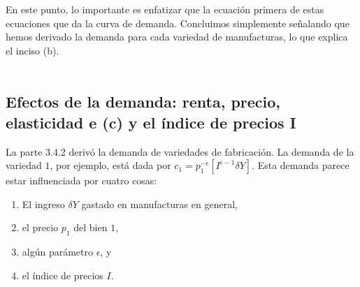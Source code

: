 En este punto, lo importante es enfatizar que la ecuación primera de estas ecuaciones que da la curva de demanda. Concluimos simplemente señalando que hemos derivado la demanda para cada variedad de manufacturas, lo que explica el inciso (b).\\\\

\subsection{Efectos de la demanda: renta, precio, elasticidad e (c) y el índice de precios I}
La parte 3.4.2 derivó la demanda de variedades de fabricación. La demanda de la variedad $1$, por ejemplo, está dada por $c_1 = p_1^{-\epsilon}[I^{\epsilon-1} \delta Y]$. Esta demanda parece estar influenciada por cuatro cosas:

\begin{enumerate}[\bfseries (i)]
    \item  El ingreso $\delta Y$ gastado en manufacturas en general,
    \item  el precio $p_1$ del bien $1$,
    \item  algún parámetro $\epsilon$, y 
    \item  el índice de precios $I$.
\end{enumerate}

